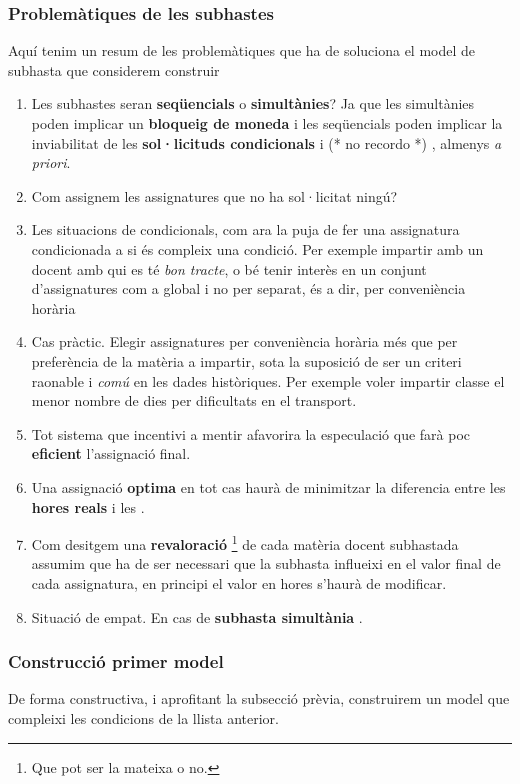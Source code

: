 \documentclass[10pt,twocolumn]{article}
\newcommand{\nehh}[1]{\color{magenta} (* {#1} *) \normalcolor }
\begin{document}
\subsubsection{Problemàtiques de les  subhastes}
Aquí tenim un resum de les problemàtiques que ha de soluciona el model de subhasta que considerem construir 
\begin{tcolorbox}[colback=black!1,title=\textbf{Llista problemàtiques subhastes},coltitle=black,colbacktitle=black!10]
\begin{enumerate}
	\item Les subhastes seran \textbf{seqüencials} o \textbf{simultànies}? Ja que les simultànies  poden implicar un \textbf{bloqueig de moneda} i les seqüencials poden implicar la inviabilitat de les \textbf{sol·licituds condicionals} i \nehh{no recordo}, almenys \textit{ a priori}.
	\item Com assignem les assignatures que no ha sol·licitat ningú?
	\item Les situacions de condicionals, com ara la puja de fer una assignatura condicionada a si  és compleix una condició.{\color{gray} Per exemple impartir amb un docent amb qui es té  \textit{bon tracte}, o bé tenir interès en un conjunt d'assignatures com a global i no per separat, és a dir, per conveniència horària} 
	\item Cas pràctic. Elegir assignatures per conveniència horària més  que per preferència de la matèria a impartir, sota la suposició de ser un criteri raonable i \textit{comú} en les dades històriques. {\color{gray} Per exemple voler impartir classe el menor nombre de dies per dificultats en el transport.}  
	\item Tot sistema que incentivi a mentir afavorira la especulació que farà poc \textbf{eficient} l'assignació final.
	\item Una assignació \textbf{optima} en tot cas haurà de  minimitzar la diferencia entre les \textbf{hores reals} i les .
	\item Com desitgem una \textbf{revaloració} \footnote{Que pot ser la mateixa o no.} de cada matèria docent subhastada assumim que ha de ser necessari que la subhasta influeixi en el valor final de cada assignatura, en principi el valor en hores s'haurà de modificar.
	\item Situació de empat. {\color{gray} En cas de \textbf{subhasta simultània} .}
\end{enumerate}
\end{tcolorbox}
\subsubsection{Construcció primer model}
De forma constructiva, i aprofitant la subsecció prèvia, construirem un model que compleixi les condicions  de la llista anterior.
\end{document}
